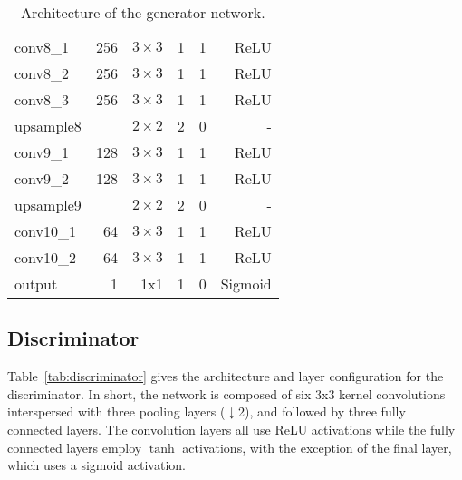 \documentclass[times,twocolumn,final,authoryear]{elsarticle}
\begin{document}
\begin{table}
\begin{tabular}{lrrrrr}
\hline
conv8\_1 & 256 & $ 3 \times 3 $ & 1 & 1 & ReLU \\
conv8\_2 & 256 & $ 3 \times 3 $ & 1 & 1 & ReLU \\
conv8\_3 & 256 & $ 3 \times 3 $ & 1 & 1 & ReLU \\
\hline
upsample8 &  & $ 2 \times 2 $ & 2 & 0 & - \\
\hline
conv9\_1 & 128 & $ 3 \times 3 $ & 1 & 1 & ReLU \\
conv9\_2 & 128 & $ 3 \times 3 $ & 1 & 1 & ReLU \\
\hline
upsample9 &  & $ 2 \times 2 $ & 2 & 0 & - \\
\hline
conv10\_1 & 64 & $ 3 \times 3 $ & 1 & 1 & ReLU \\
conv10\_2 & 64 & $ 3 \times 3 $ & 1 & 1 & ReLU \\
\hline
output&1&1x1&1&0&Sigmoid\\
\hline
\end{tabular}
\caption{Architecture of the generator network.}
\label{tab:generator}
\end{table}


\subsection{Discriminator}
\label{ssec:Discriminator}

\par Table~\ref{tab:discriminator} gives the architecture and layer configuration for the discriminator. In short, the network is composed of six 3x3 kernel convolutions interspersed with three pooling layers ($\downarrow$2), and followed by three fully connected layers. The convolution layers all use ReLU activations while the fully connected layers employ $\tanh$ activations, with the exception of the final layer, which uses a sigmoid activation. 
\end{document}
